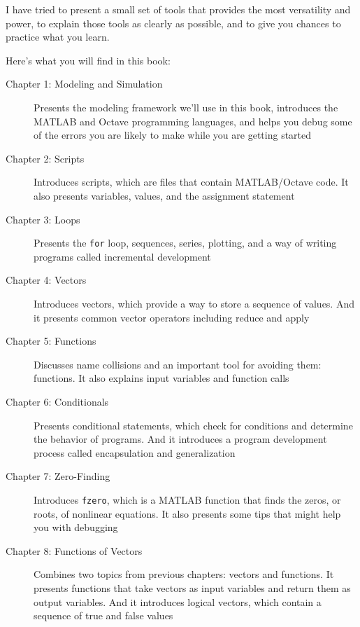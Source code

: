 I have tried to present a small set of tools that provides the most versatility and power, to explain those tools as clearly as possible, and to give you chances to practice what you learn.

Here's what you will find in this book:

\begin{description}
\item [Chapter 1: Modeling and Simulation] Presents the modeling framework we'll use in this book, introduces the MATLAB and Octave programming languages, and helps you debug some of the errors you are likely to make while you are getting started

\item [Chapter 2: Scripts] Introduces scripts, which are files that contain MATLAB/Octave code.  It also presents variables, values, and the assignment statement

\item [Chapter 3: Loops] Presents the \lstinline{for} loop, sequences, series, plotting, and a way of writing programs called incremental development

\item [Chapter 4: Vectors] Introduces vectors, which provide a way to store a sequence of values.  And it presents common vector operators including reduce and apply

\item [Chapter 5: Functions] Discusses name collisions and an important tool for avoiding them: functions.  It also explains input variables and function calls

\item [Chapter 6: Conditionals] Presents conditional statements, which check for conditions and determine the behavior of programs.  And it introduces a program development process called encapsulation and generalization

\item [Chapter 7: Zero-Finding] Introduces \lstinline{fzero}, which is a MATLAB function that finds the zeros, or roots, of nonlinear equations.  It also presents some tips that might help you with debugging

\item [Chapter 8: Functions of Vectors] Combines two topics from previous chapters: vectors and functions.  It presents functions that take vectors as input variables and return them as output variables.  And it \mbox{introduces} logical vectors, which contain a sequence of true and false values


\end{description}
